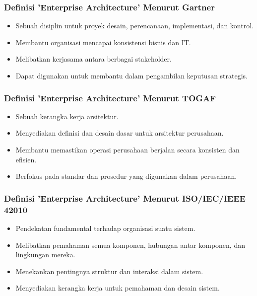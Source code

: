 \documentclass[aspectratio=169, table]{beamer}
\begin{document}
	
	
	\begin{frame}
		\frametitle{Definisi 'Enterprise Architecture' Menurut Gartner}
		\begin{itemize}
			\item Sebuah disiplin untuk proyek desain, perencanaan, implementasi, dan kontrol.
			\item Membantu organisasi mencapai konsistensi bisnis dan IT.
			\item Melibatkan kerjasama antara berbagai stakeholder.
			\item Dapat digunakan untuk membantu dalam pengambilan keputusan strategis.
		\end{itemize}
	\end{frame}
	
	\begin{frame}
		\frametitle{Definisi 'Enterprise Architecture' Menurut TOGAF}
		\begin{itemize}
			\item Sebuah kerangka kerja arsitektur.
			\item Menyediakan definisi dan desain dasar untuk arsitektur perusahaan.
			\item Membantu memastikan operasi perusahaan berjalan secara konsisten dan efisien.
			\item Berfokus pada standar dan prosedur yang digunakan dalam perusahaan.
		\end{itemize}
	\end{frame}
	
	\begin{frame}
		\frametitle{Definisi 'Enterprise Architecture' Menurut ISO/IEC/IEEE 42010}
		\begin{itemize}
			\item Pendekatan fundamental terhadap organisasi suatu sistem.
			\item Melibatkan pemahaman semua komponen, hubungan antar komponen, dan lingkungan mereka.
			\item Menekankan pentingnya struktur dan interaksi dalam sistem.
			\item Menyediakan kerangka kerja untuk pemahaman dan desain sistem.
		\end{itemize}
	\end{frame}
	
\end{document}

